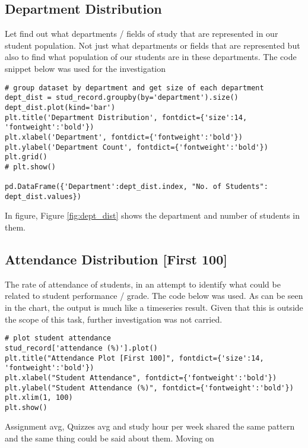 \subsection{Department Distribution}
Let find out what departments / fields of study that are represented in our student population. Not just what departments or fields that are represented but also to find what population of our students are in these departments. 
The code snippet below was used for the investigation
\begin{verbatim}
# group dataset by department and get size of each department
dept_dist = stud_record.groupby(by='department').size()
dept_dist.plot(kind='bar')
plt.title('Department Distribution', fontdict={'size':14, 'fontweight':'bold'})
plt.xlabel('Department', fontdict={'fontweight':'bold'})
plt.ylabel('Department Count', fontdict={'fontweight':'bold'})
plt.grid()
# plt.show()

pd.DataFrame({'Department':dept_dist.index, "No. of Students": dept_dist.values})
\end{verbatim}

In figure, Figure \ref{fig:dept_dist} shows the department and number of students in them. 


\subsection{Attendance Distribution [First 100]}
The rate of attendance of students, in an attempt to identify what could be related to student performance / grade. 
The code below was used. As can be seen in the chart, the output is much like a timeseries result. Given that this is outside the scope of this task, further investigation was not carried. 

\begin{verbatim}
# plot student attendance
stud_record['attendance (%)'].plot()
plt.title("Attendance Plot [First 100]", fontdict={'size':14, 'fontweight':'bold'})
plt.xlabel("Student Attendance", fontdict={'fontweight':'bold'})
plt.ylabel("Student Attendance (%)", fontdict={'fontweight':'bold'})
plt.xlim(1, 100)
plt.show()
\end{verbatim}
Assignment avg, Quizzes avg and study hour per week shared the same pattern and the same thing could be said about them. Moving on

